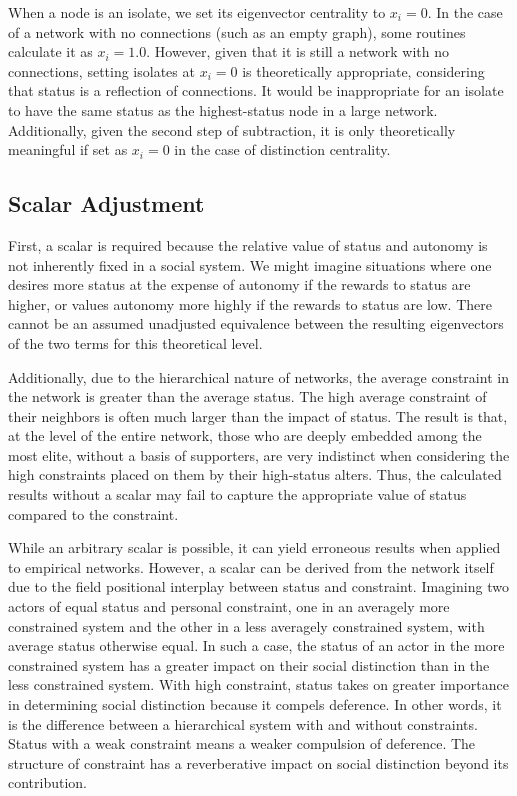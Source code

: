 \documentclass[12pt]{article}
\begin{document}
When a node is an isolate, we set its eigenvector centrality to $x_i =0$. In the case of a network with no connections (such as an empty graph), some routines calculate it as $x_i =1.0$. However, given that it is still a network with no connections, setting isolates at $x_i =0$ is theoretically appropriate, considering that status is a reflection of connections. It would be inappropriate for an isolate to have the same status as the highest-status node in a large network. Additionally, given the second step of subtraction, it is only theoretically meaningful if set as $x_i =0$ in the case of distinction centrality.

\subsection{Scalar Adjustment}
First, a scalar is required because the relative value of status and autonomy is not inherently fixed in a social system. We might imagine situations where one desires more status at the expense of autonomy if the rewards to status are higher, or values autonomy more highly if the rewards to status are low. There cannot be an assumed unadjusted equivalence between the resulting eigenvectors of the two terms for this theoretical level.

Additionally, due to the hierarchical nature of networks, the average constraint in the network is greater than the average status. The high average constraint of their neighbors is often much larger than the impact of status. The result is that, at the level of the entire network, those who are deeply embedded among the most elite, without a basis of supporters, are very indistinct when considering the high constraints placed on them by their high-status alters. Thus, the calculated results without a scalar may fail to capture the appropriate value of status compared to the constraint.

While an arbitrary scalar is possible, it can yield erroneous results when applied to empirical networks. However, a scalar can be derived from the network itself due to the field positional interplay between status and constraint. Imagining two actors of equal status and personal constraint, one in an averagely more constrained system and the other in a less averagely constrained system, with average status otherwise equal. In such a case, the status of an actor in the more constrained system has a greater impact on their social distinction than in the less constrained system. With high constraint, status takes on greater importance in determining social distinction because it compels deference. In other words, it is the difference between a hierarchical system with and without constraints. Status with a weak constraint means a weaker compulsion of deference. The structure of constraint has a reverberative impact on social distinction beyond its contribution.
\end{document}

